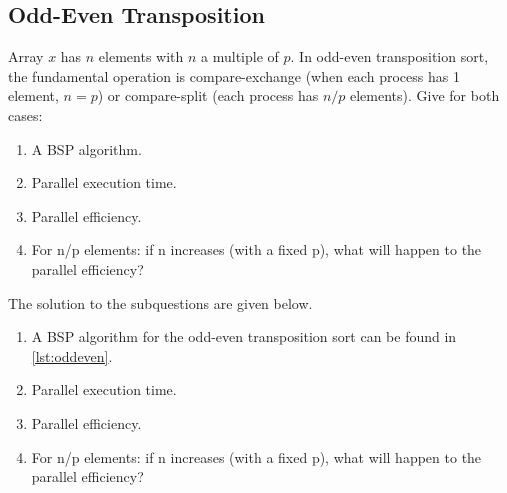 \documentclass[../main.tex]{subfiles}
\begin{document}
\subsection{Odd-Even Transposition}
\begin{question}
Array $x$ has $n$ elements with $n$ a multiple of $p$. In odd-even transposition sort, the fundamental operation is compare-exchange (when each process has 1 element, $n = p$) or compare-split (each process has $n/p$ elements). Give for both cases:
\begin{enumerate}
	\item A BSP algorithm.
	\item Parallel execution time.
	\item Parallel efficiency.
	\item For n/p elements: if n increases (with a fixed p), what will happen to the parallel efficiency?
\end{enumerate}

\end{question}
\begin{solution} The solution to the subquestions are given below.
\begin{enumerate}
	\item A BSP algorithm for the odd-even transposition sort can be found in \autoref{lst:oddeven}.
		
	\item Parallel execution time.
	\item Parallel efficiency.
	\item For n/p elements: if n increases (with a fixed p), what will happen to the parallel efficiency?
\end{enumerate}
\end{solution}
\end{document}
